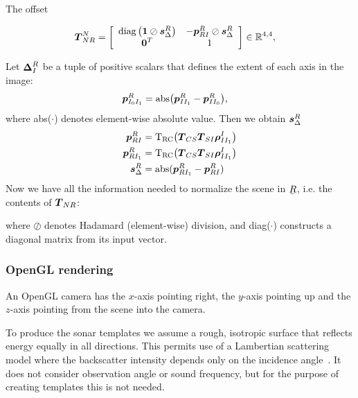 The offset 

\begin{align}
\dvec{T}_{NR}^N &= 
\left[\begin{array}{c c}
 \diag\left(\boldsymbol{1}\oslash\dvec{s}_\Delta^R\right)  & -\dvec{p}_{RI}^R\oslash\dvec{s}_\Delta^R \\%
 \dvec{0}^T  &  1
\end{array}\right] \in \mathbb{R}^{4,4}, \label{eq_T_NR}
\end{align}


Let $\boldsymbol{\Delta}_I^R$ be a tuple of positive scalars that defines the extent of each axis in the image:
%
\begin{align}\label{eq:M}
\dvec{p}_{I_0I_1}^R &= \mathrm{abs}\big(\dvec{p}_{II_1}^R-\dvec{p}_{II_0}^R\big),
\end{align}
%
where abs($\cdot$) denotes element-wise absolute value. Then we obtain $\boldsymbol{s}_\Delta^R$
\begin{align}\label{eq:M}
\dvec{p}_{RI}^R   &= \mathrm{T_{RC}}\big(\mat{T}_{CS}\mat{T}_{SI}\dvec{\rho}_{II_1}^I\big) \\
\dvec{p}_{RI_1}^R &= \mathrm{T_{RC}}\big(\mat{T}_{CS}\mat{T}_{SI}\dvec{\rho}_{II_1}^I\big) \\
\dvec{s}_\Delta^R &= \mathrm{abs}(\dvec{p}_{RI_1}^R - \dvec{p}_{RI}^R)
\end{align}
%
Now we have all the information needed to normalize the scene in $\ubar{R}$, i.e. the contents of $\boldsymbol{T}_{NR}$:
%

%
where $\oslash$ denotes Hadamard (element-wise) division, and diag($\cdot$) constructs a diagonal matrix from its input vector. 



\subsubsection{OpenGL rendering}

An OpenGL camera has the $x$-axis pointing right, the $y$-axis pointing up and the $z$-axis pointing from the scene into the camera.

To produce the sonar templates we assume a rough, isotropic surface that reflects energy equally in all directions. This permits use of a Lambertian scattering model where the backscatter intensity depends only on the incidence angle~\cite{Zhang1999}. It does not consider observation angle or sound frequency, but for the purpose of creating templates this is not needed.   


